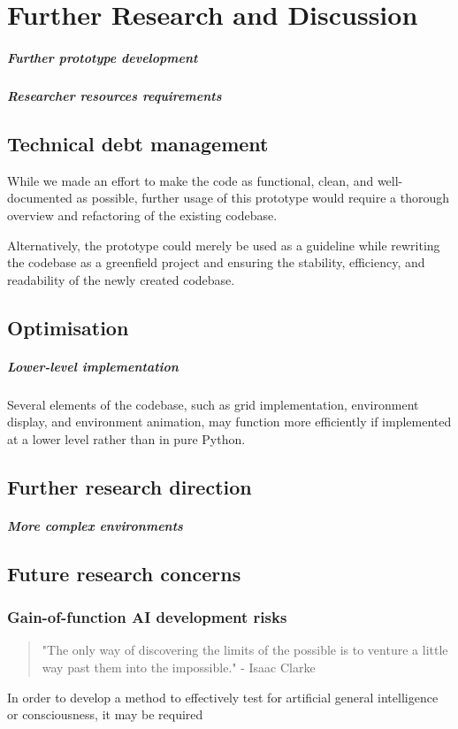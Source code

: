 \documentclass[masterthesis]{fer}
\begin{document}
\chapter{Further Research and Discussion}

\paragraph{Further prototype development}
\label{sec:further_research_suggestions}
\paragraph{Researcher resources requirements}
\section{Technical debt management}
While we made an effort to make the code as functional, clean, and well-documented as possible,
further usage of this prototype would require a thorough overview and refactoring of the existing codebase.

Alternatively, the prototype could merely be used as a guideline while rewriting the codebase as a greenfield project and ensuring the stability, efficiency, and readability of the newly created codebase.
\section{Optimisation}
\paragraph{Lower-level implementation}
Several elements of the codebase, such as grid implementation, environment display, and environment animation,
may function more efficiently if implemented at a lower level rather than in pure Python.
\section{Further research direction}
\paragraph{More complex environments}
\section{Future research concerns}
\subsection{Gain-of-function AI development risks}
\begin{quote}
"The only way of discovering the limits of the possible is to venture a little way past them into the impossible." - Isaac Clarke
\end{quote}
In order to develop a method to effectively test for artificial general intelligence or consciousness, it may be required  
\end{document}
